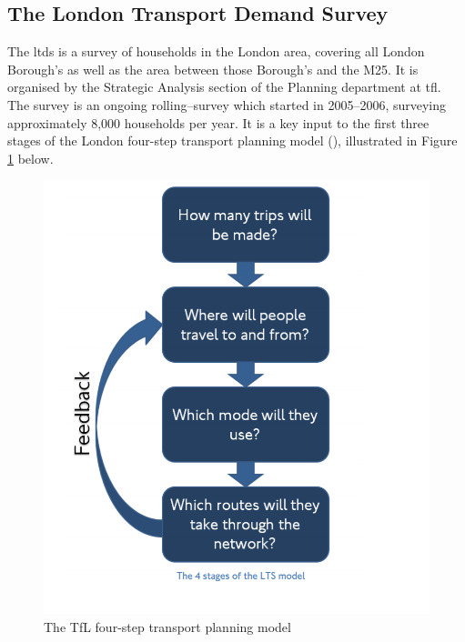 
\subsection{The London Transport Demand Survey}
\label{subsec:the_ltds}

The \gls{ltds} is a survey of households in the London area, covering all London Borough's as well as the area between those Borough's and the M25. It is organised by the Strategic Analysis section of the Planning department at \gls{tfl}. The survey is an ongoing rolling--survey which started in 2005--2006, surveying approximately 8,000 households per year. It is a key input to the first three stages of the London four-step transport planning model (\cite{TFL2018}), illustrated in Figure \ref{fig:tfl_four_step} below.

\begin{figure}[H]
\centering
\includegraphics[scale=0.6]{images/tfl_four_step.png}
\caption{The TfL four-step transport planning model}
\label{fig:tfl_four_step}
\end{figure}

